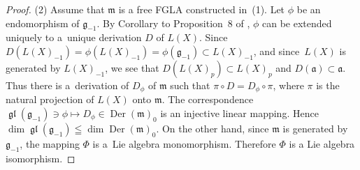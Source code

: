 \documentclass[11pt]{article}
\numberwithin{equation}{section}
\numberwithin{theorem}{section}
\numberwithin{proposition}{section}
\numberwithin{lemma}{section}
\numberwithin{corollary}{section}
\numberwithin{definition}{section}
\numberwithin{example}{section}
\numberwithin{remark}{section}
\numberwithin{note}{section}
\newcommand{\gl}{\operatorname{\mathfrak{gl}}}
\newcommand{\Der}{\operatorname{Der}}
\begin{document}
\begin{proof}
(2) Assume that $\mathfrak m$ is a free FGLA
constructed in~(1).
Let $\phi$ be an endomorphism of $\mathfrak g_{-1}$.
By Corollary to Proposition~8 of \cite[Chapter~II, \S~2, no.~8]{bou72:1},
$\phi$ can be extended uniquely to a~unique derivation $D$ of $L(X)$.
Since $D(L(X)_{-1})=\phi(L(X)_{-1})=\phi(\mathfrak g_{-1})\subset L(X)_{-1}$,
and since~$L(X)$ is generated by $L(X)_{-1}$, we see that
$D(L(X)_{p})\subset L(X)_{p}$ and $D(\mathfrak a)\subset \mathfrak a$.
Thus there is a~derivation of $D_\phi$ of $\mathfrak m$ such that
$\pi\circ D=D_\phi\circ \pi$, where $\pi$ is the natural projection of $L(X)$ onto $\mathfrak m$.
The correspondence
$\gl(\mathfrak g_{-1})\ni\phi\mapsto D_\phi\in\Der(\mathfrak m)_0$
is an injective linear mapping.
Hence $\dim \gl(\mathfrak g_{-1})\leqq\dim \Der(\mathfrak m)_0$.
On the other hand, since $\mathfrak m$ is generated by $\mathfrak g_{-1}$,
the mapping $\Phi$ is a~Lie algebra monomorphism.
Therefore $\Phi$ is a Lie algebra isomorphism.
\end{proof}
\end{document}
